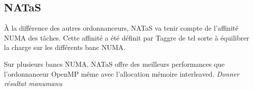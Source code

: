 \subsection{NATaS}
\`A la différence des autres ordonnanceurs, NATaS va tenir compte de l'affinité NUMA des tâches.
%
Cette affinité a été définit par Taggre de tel sorte à équilibrer la charge sur les différents banc NUMA.
%



Sur plusieurs bancs NUMA, NATaS offre des meilleurs performances que l'ordonnanceur OpenMP même avec l'allocation mémoire interleaved.
%
{\em Donner résultat manumanu}
%

